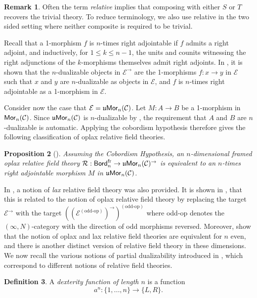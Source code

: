 \documentclass[10pt, reqno, twoside
, final
]{amsart}
\numberwithin{equation}{subsection}%
\theoremstyle{definition}
\newtheorem{defn}{Definition}[subsection]
\theoremstyle{definition}
\theoremstyle{definition}
\theoremstyle{definition}
\theoremstyle{definition}
\theoremstyle{definition}
\theoremstyle{definition}
\theoremstyle{definition}
\theoremstyle{definition}
\theoremstyle{plain}
\theoremstyle{definition}
\theoremstyle{plain}
\theoremstyle{definition}
\theoremstyle{plain}
\theoremstyle{definition}
\newtheorem{rmk}[defn]{Remark}
\theoremstyle{definition}
\theoremstyle{plain}
\theoremstyle{plain}
\theoremstyle{definition}
\theoremstyle{plain}
\theoremstyle{plain}
\newtheorem{prop}[defn]{Proposition}
\theoremstyle{plain}
\begin{document}
\begin{rmk}
Often the term \emph{relative} implies that composing with either $S$ or $T$ recovers the trivial theory. To reduce terminology, we also use relative in the two sided setting where neither composite is required to be trivial.
\end{rmk}

Recall that a 1-morphism $f$ is $n$-times right adjointable if $f$ admits a right adjoint, and inductively, for $1\leq k\leq n-1$, the units and counits witnessing the right adjunctions of the $k$-morphisms themselves admit right adjoints. In \cite{JFS}, it is shown that the $n$-dualizable objects in $\mathcal{E}^\to$ are the 1-morphisms $f:x\to y$ in $\mathcal{E}$ such that $x$ and $y$ are $n$-dualizable as objects in $\mathcal{E}$, and $f$ is $n$-times right adjointable as a 1-morphism in $\mathcal{E}$. 

Consider now the case that $\mathcal{E} = \mathfrak{u}\mathsf{Mor}_n(\mathcal{C})$. Let $M:A\to B$ be a 1-morphism in $\mathsf{Mor}_n(\mathcal{C})$. Since $\mathfrak{u}\mathsf{Mor}_n(\mathcal{C})$ is $n$-dualizable by \cite{GS}, the requirement that $A$ and $B$ are $n$-dualizable is automatic. Applying the cobordism hypothesis therefore gives the following classification of oplax relative field theories.

\begin{prop}[\cite{JFS}]\label{prop:oplax-classification}
Assuming the Cobordism Hypothesis, an $n$-dimensional framed oplax relative field theory $\mathcal{R} : \mathsf{Bord}_{n}^{\text{fr}} \to \mathfrak{u}\mathsf{Mor}_{n}(\mathcal{C})^\to$
is equivalent to an $n$-times right adjointable morphism $M$ in $\mathfrak{u}\mathsf{Mor}_{n}(\mathcal{C})$.
\end{prop}

In \cite{JFS}, a notion of \emph{lax} relative field theory was also provided. It is shown in \cite{SS25}, that this is related to the notion of oplax relative field theory by replacing the target $\mathcal{E}^{\to}$ with the target $((\mathcal{E}^{(\text{odd-op})})^{\to})^{(\text{odd-op})}$ where odd-op denotes the $(\infty,N)$-category with the direction of odd morphisms reversed. Moreover, \cite{SS25} show that the notion of oplax and lax relative field theories are equivalent for $n$ even, and there is another distinct version of relative field theory in these dimensions. We now recall the various notions of partial dualizability introduced in \cite{SS25}, which correspond to different notions of relative field theories.

\begin{defn}\label{def:dexterity-fn}
A \textit{dexterity function of length $n$} is a function
\begin{equation*}
    a^n:\{1,...,n\} \to \{L,R\}.
\end{equation*} 
\end{defn}
\end{document}
